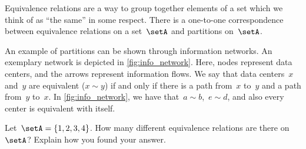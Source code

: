 \begin{remark}
	Equivalence relations are a way to group together elements of a set which we think of as ``the same'' in some respect.
	There is a one-to-one correspondence between equivalence relations on a set~$\setA$ and partitions on~$\setA$.
\end{remark}

\begin{marginfigure}
	\centering
	\caption{
		\label{fig:info_network}
	}
\end{marginfigure}

\begin{example}
	An example of partitions can be shown through information networks.
	An exemplary network is depicted in \cref{fig:info_network}.
	Here, nodes represent data centers, and the arrows represent information flows.
	We say that data centers~$x$ and~$y$ are equivalent ($x\sim y$) if and only if there is a path from~$x$ to~$y$ and a path from~$y$ to~$x$.
	In \cref{fig:info_network}, we have that~$a\sim b$,~$e\sim d$, and also every center is equivalent with itself.
\end{example}

\vfill
\begin{gradedexercise}
	\label{ex:CountingEquivalenceRelations}
	Let~$\setA = \{ 1, 2, 3, 4 \}$.
	How many different equivalence relations are there on $\setA$?
	Explain how you found your answer.
\end{gradedexercise}

